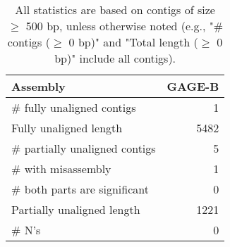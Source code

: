 \documentclass[12pt,a4paper]{article}
\begin{document}
\begin{table}[ht]
\begin{center}
\caption{All statistics are based on contigs of size $\geq$ 500 bp, unless otherwise noted (e.g., "\# contigs ($\geq$ 0 bp)" and "Total length ($\geq$ 0 bp)" include all contigs).}
\begin{tabular}{|l*{1}{|r}|}
\hline
Assembly & GAGE-B \\ \hline
\# fully unaligned contigs & 1 \\ \hline
Fully unaligned length & 5482 \\ \hline
\# partially unaligned contigs & 5 \\ \hline
\hspace{5mm}\# with misassembly & 1 \\ \hline
\hspace{5mm}\# both parts are significant & 0 \\ \hline
Partially unaligned length & 1221 \\ \hline
\# N's & 0 \\ \hline
\end{tabular}
\end{center}
\end{table}
\end{document}
